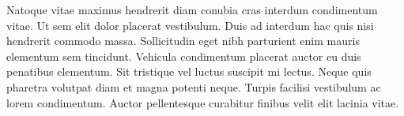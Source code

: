 Natoque vitae maximus hendrerit diam conubia cras interdum condimentum vitae. Ut sem elit dolor placerat vestibulum. Duis ad interdum hac quis nisi hendrerit commodo massa. Sollicitudin eget nibh parturient enim mauris elementum sem tincidunt. Vehicula condimentum placerat auctor eu duis penatibus elementum. Sit tristique vel luctus suscipit mi lectus. Neque quis pharetra volutpat diam et magna potenti neque. Turpis facilisi vestibulum ac lorem condimentum. Auctor pellentesque curabitur finibus velit elit lacinia vitae.
